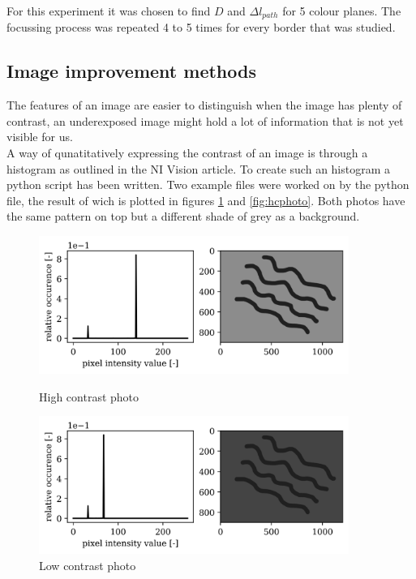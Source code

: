 For this experiment it was chosen to find $D$ and $\Delta l_{path}$ for 5 colour planes. The focussing process was repeated 4 to 5 times for every border that was studied.

\subsection{Image improvement methods}
The features of an image are easier to distinguish when the image has plenty of contrast, an underexposed image might hold a lot of information that is not yet visible for us.\\
A way of qunatitatively expressing the contrast of an image is through a histogram as outlined in the NI Vision article\cite{histogram_theory}. To create such an histogram a python script has been written. Two example files were worked on by the python file, the result of wich is plotted in figures \ref{fig:lcphoto} and \ref{fig:hcphoto}. Both photos have the same pattern on top but a different shade of grey as a background.\\

\begin{figure}[h!]
    \centering
    \begin{minipage}{.5\textwidth}
      \centering
      \includegraphics[width=0.9\textwidth,keepaspectratio]{afbeeldingen/histograms/highcontrast.png}
      \caption{High contrast photo}
      \label{fig:hcphoto}
    \end{minipage}%
    \begin{minipage}{.5\textwidth}
      \centering
      \includegraphics[width=0.9\textwidth,keepaspectratio]{afbeeldingen/histograms/lowcontrast.png}
      \caption{Low contrast photo}
      \label{fig:lcphoto}
    \end{minipage}
\end{figure}

